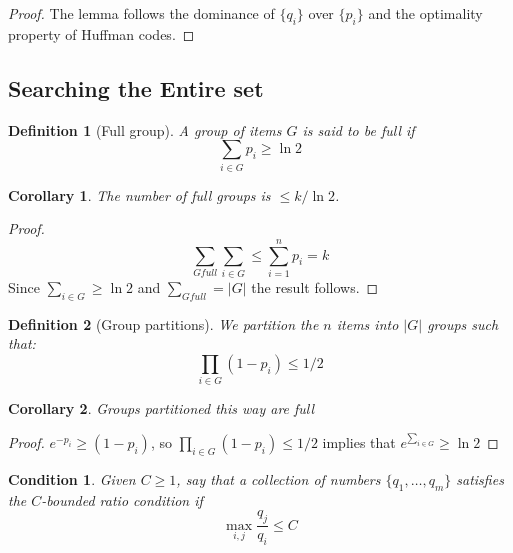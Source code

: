 \documentclass[11pt]{article}
\newtheorem{definition}{Definition}[section]
\newtheorem{cor}{Corollary}[section]
\newtheorem{condition}{Condition}[section]
\begin{document}
\begin{proof}
The lemma follows the dominance of \(\{q_i\}\) over \(\{p_i\}\) and the optimality property of Huffman codes.
\end{proof}

\subsection{Searching the Entire set}
\begin{definition}[Full group]
A group of items \(G\) is said to be full if
\begin{equation}
\sum_{i \in G} p_i \geq \ln{2}
\end{equation}
\end{definition}

\begin{cor}
The number of full groups is \(\leq k/ \ln{2} \).
\end{cor}
\begin{proof}
\begin{equation}
\sum_{G full} \sum_{i\in G} \leq \sum_{i=1}^n p_i = k
\end{equation}
Since \(\sum_{i\in G} \geq \ln{2}\) and \(\sum_{G full} = |G|\) the result follows.
\end{proof}

\begin{definition}[Group partitions]
We partition the \(n\) items into \(|G|\) groups such that:
\begin{equation}
\prod_{i\in G} \left(1-p_i\right) \leq 1/2
\end{equation}
\end{definition}

\begin{cor}
Groups partitioned this way are full
\end{cor}

\begin{proof}
\( e^{-p_i} \geq \left(1-p_i \right) \), so \(\prod_{i\in G} \left(1-p_i\right) \leq 1/2\) implies that \(e^{ \sum_{i \in G}} \geq \ln{2}\)
\end{proof}

\begin{condition} 
Given \(C \geq 1\), say that a collection of numbers \(\{ q_1, \ldots, q_m \}\) satisfies the \(C\)-bounded ratio condition if
\begin{equation}
\max_{i,j} \frac{q_j}{q_i} \leq C
\end{equation}
\end{condition}
\end{document}
